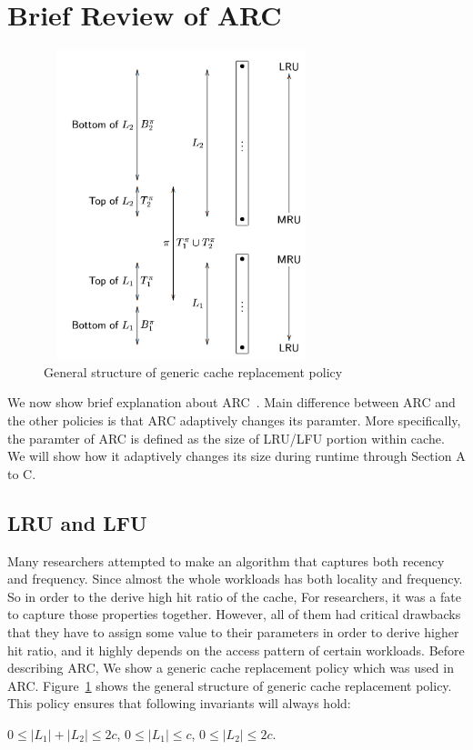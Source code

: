 


\section{Brief Review of ARC}

\begin{figure}[t]
 \centering
 \includegraphics[width=8cm,height=9cm]{Figures/arc.PNG}
 \captionsetup[figure]{font=normalsize}
 \caption{General structure of generic cache replacement policy}
 \vspace{-0.5cm}
 \label{fig:arc}
\end{figure}


We now show brief explanation about ARC~\cite{arc}. Main difference between ARC and the other policies is that ARC adaptively changes its paramter. More specifically, the paramter of ARC is defined as the size of LRU/LFU portion within cache. We will show how it adaptively changes its size during runtime through Section A to C. 

\subsection{LRU and LFU}
 Many researchers attempted to make an algorithm that captures both recency and frequency. Since almost the whole workloads has both locality and frequency. So in order to the derive high hit ratio of the cache, For researchers, it was a fate to capture those properties together. However, all of them had critical drawbacks that they have to assign some value to their parameters in order to derive higher hit ratio, and it highly depends on the access pattern of certain workloads. Before describing ARC, We show a generic cache replacement policy which was used in ARC. Figure~\ref{fig:arc} shows the general structure of generic cache replacement policy. \\
 This policy ensures that following invariants will always hold:\\
 \vspace{-0.2cm}
 \begin{center}
 $ 0 \leq |L_1| + |L_2| \leq 2c$, $ 0 \leq |L_1| \leq c$, $0\leq |L_2| \leq 2c.$
 \end{center}

